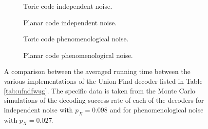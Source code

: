 \begin{figure}[htbp]
  \centering
  \begin{subfigure}[b]{0.49\textwidth}
    \begin{adjustbox}{Clip=0 1em 0 0}
      
    \end{adjustbox}
    \caption{Toric code independent noise.}
\end{subfigure}
\begin{subfigure}[b]{0.49\textwidth}
    \begin{adjustbox}{Clip=0 1em 0 0}
      
    \end{adjustbox}
    \caption{Planar code independent noise.}
\end{subfigure}
  \begin{subfigure}[b]{0.49\textwidth}
    \begin{adjustbox}{Clip=0 1em 0 0}
      
    \end{adjustbox}
    \caption{Toric code phenomenological noise.}
  \end{subfigure}
  \begin{subfigure}[b]{0.49\textwidth}
    \begin{adjustbox}{Clip=0 1em 0 0}
      
    \end{adjustbox}
    \caption{Planar code phenomenological noise.}
  \end{subfigure}
  \caption{A comparison between the averaged running time between the various implementations of the Union-Find decoder listed in Table \ref{tab:ufndfwug}. The specific data is taken from the Monte Carlo simulations of the decoding success rate of each of the decoders for independent noise with $p_X = 0.098$ and for phenomenological noise with $p_X = 0.027$.}\label{fig:tcomp_uf}
\end{figure}